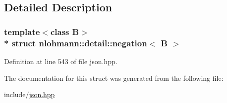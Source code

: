 \subsection{Detailed Description}
\subsubsection*{template$<$class B$>$\\*
struct nlohmann\+::detail\+::negation$<$ B $>$}



Definition at line 543 of file json.\+hpp.



The documentation for this struct was generated from the following file\+:\begin{DoxyCompactItemize}
\item 
include/\hyperlink{json_8hpp}{json.\+hpp}\end{DoxyCompactItemize}
